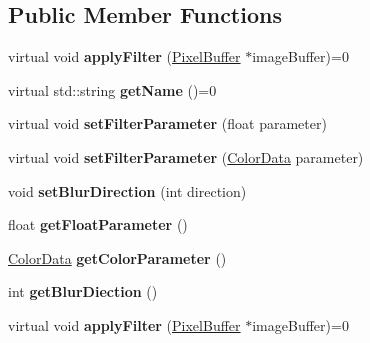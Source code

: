 \subsection*{Public Member Functions}
\begin{DoxyCompactItemize}
\item 
\hypertarget{classFilter_a2ecb4bc0e81851d30f46f30bf81d1739}{virtual void {\bfseries apply\-Filter} (\hyperlink{classPixelBuffer}{Pixel\-Buffer} $\ast$image\-Buffer)=0}\label{classFilter_a2ecb4bc0e81851d30f46f30bf81d1739}

\item 
\hypertarget{classFilter_a212f40acb6481b2e36c3d129007519f1}{virtual std\-::string {\bfseries get\-Name} ()=0}\label{classFilter_a212f40acb6481b2e36c3d129007519f1}

\item 
\hypertarget{classFilter_aba015e9da647ba41fee4b41019d54516}{virtual void {\bfseries set\-Filter\-Parameter} (float parameter)}\label{classFilter_aba015e9da647ba41fee4b41019d54516}

\item 
\hypertarget{classFilter_a88314088e678c9a7cdbe0d0557385fa8}{virtual void {\bfseries set\-Filter\-Parameter} (\hyperlink{classColorData}{Color\-Data} parameter)}\label{classFilter_a88314088e678c9a7cdbe0d0557385fa8}

\item 
\hypertarget{classFilter_ada9d5f112e217c9bcf413093eae2a1e9}{void {\bfseries set\-Blur\-Direction} (int direction)}\label{classFilter_ada9d5f112e217c9bcf413093eae2a1e9}

\item 
\hypertarget{classFilter_a9f741b045bf1d57e485f116ce62ebac1}{float {\bfseries get\-Float\-Parameter} ()}\label{classFilter_a9f741b045bf1d57e485f116ce62ebac1}

\item 
\hypertarget{classFilter_abf85cdf0cda6dbe1dbcd6b8813aeecf3}{\hyperlink{classColorData}{Color\-Data} {\bfseries get\-Color\-Parameter} ()}\label{classFilter_abf85cdf0cda6dbe1dbcd6b8813aeecf3}

\item 
\hypertarget{classFilter_a465a168fc580c773e58d4df2f3db5968}{int {\bfseries get\-Blur\-Diection} ()}\label{classFilter_a465a168fc580c773e58d4df2f3db5968}

\item 
\hypertarget{classFilter_a2ecb4bc0e81851d30f46f30bf81d1739}{virtual void {\bfseries apply\-Filter} (\hyperlink{classPixelBuffer}{Pixel\-Buffer} $\ast$image\-Buffer)=0}\label{classFilter_a2ecb4bc0e81851d30f46f30bf81d1739}


\end{DoxyCompactItemize}
